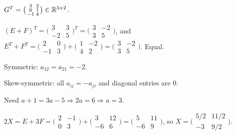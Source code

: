 \begin{solutions}
  \item $G^{T} = \bigl(\begin{smallmatrix} 3 & 2 \\ 0 & 1 \\ -1 & 4 \end{smallmatrix}\bigr) \in \mathbb{R}^{3 \times 2}$.

  \item $(E + F)^{T} = \bigl(\begin{smallmatrix} 3 & 3 \\ -2 & 5 \end{smallmatrix}\bigr)^{T} = \bigl(\begin{smallmatrix} 3 & -2 \\ 3 & 5 \end{smallmatrix}\bigr)$, and $E^{T} + F^{T} = \bigl(\begin{smallmatrix} 2 & 0 \\ -1 & 3 \end{smallmatrix}\bigr) + \bigl(\begin{smallmatrix} 1 & -2 \\ 4 & 2 \end{smallmatrix}\bigr) = \bigl(\begin{smallmatrix} 3 & -2 \\ 3 & 5 \end{smallmatrix}\bigr)$. Equal.

  \item Symmetric: $a_{12} = a_{21} = -2$.

  \item Skew-symmetric: all $a_{ij} = -a_{ji}$ and diagonal entries are $0$.

  \item Need $a + 1 = 3 a - 5 \Rightarrow 2 a = 6 \Rightarrow a = 3$.

  \item $2 X = E + 3 F = \bigl(\begin{smallmatrix} 2 & -1 \\ 0 & 3 \end{smallmatrix}\bigr) + \bigl(\begin{smallmatrix} 3 & 12 \\ -6 & 6 \end{smallmatrix}\bigr) = \bigl(\begin{smallmatrix} 5 & 11 \\ -6 & 9 \end{smallmatrix}\bigr)$, so $X = \bigl(\begin{smallmatrix} 5/2 & 11/2 \\ -3 & 9/2 \end{smallmatrix}\bigr)$.


\end{solutions}
